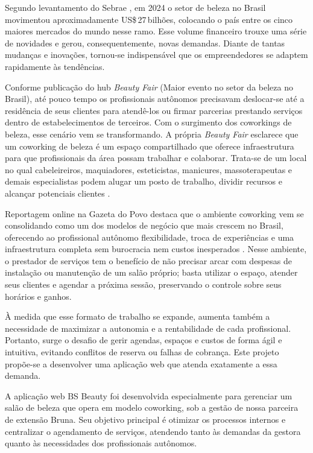 
Segundo levantamento do Sebrae \cite{Sebrae_2024}
, em 2024 o setor de beleza no Brasil movimentou aproximadamente US\$\,27\,bilhões, colocando o país entre os cinco maiores mercados do mundo nesse ramo. Esse volume financeiro trouxe uma série de novidades e gerou, consequentemente, novas demandas. Diante de tantas mudanças e inovações, tornou-se indispensável que os empreendedores se adaptem rapidamente às tendências.

Conforme publicação do hub \emph{Beauty Fair} (Maior evento no setor da beleza no Brasil), até pouco tempo os profissionais autônomos precisavam deslocar-se até a residência de seus clientes para atendê-los ou firmar parcerias prestando serviços dentro de estabelecimentos de terceiros. Com o surgimento dos coworkings de beleza, esse cenário vem se transformando. A própria \emph{Beauty Fair} esclarece que um coworking de beleza é um espaço compartilhado que oferece infraestrutura para que profissionais da área possam trabalhar e colaborar. Trata-se de um local no qual cabeleireiros, maquiadores, esteticistas, manicures, massoterapeutas e demais especialistas podem alugar um posto de trabalho, dividir recursos e alcançar potenciais clientes \cite{BeautyFair}.

Reportagem online na Gazeta do Povo destaca que o ambiente coworking vem se consolidando como um dos modelos de negócio que mais crescem no Brasil, oferecendo ao profissional autônomo flexibilidade, troca de experiências e uma infraestrutura completa sem burocracia nem custos inesperados \cite{gazeta-coworking}. Nesse ambiente, o prestador de serviços tem o benefício de não precisar arcar com despesas de instalação ou manutenção de um salão próprio; basta utilizar o espaço, atender seus clientes e agendar a próxima sessão, preservando o controle sobre seus horários e ganhos.

À medida que esse formato de trabalho se expande, aumenta também a necessidade de maximizar a autonomia e a rentabilidade de cada profissional. Portanto, surge o desafio de gerir agendas, espaços e custos de forma ágil e intuitiva, evitando conflitos de reserva ou falhas de cobrança. Este projeto propõe-se a desenvolver uma aplicação web que atenda exatamente a essa demanda.

A aplicação web BS Beauty foi desenvolvida especialmente para gerenciar um salão de beleza que opera em modelo coworking, sob a gestão de nossa parceira de extensão Bruna. Seu objetivo principal é otimizar os processos internos e centralizar o agendamento de serviços, atendendo tanto às demandas da gestora quanto às necessidades dos profissionais autônomos.





